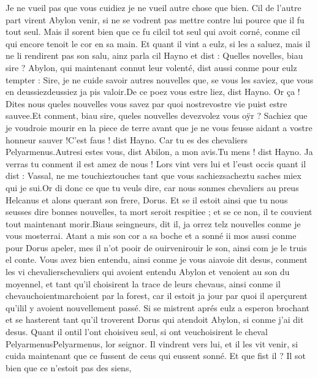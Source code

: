 \documentclass{article}
\begin{document}
\begin{pages}
   Je ne vueil pas que vous cuidiez je ne vueil autre chose que bien.
   Cil de l’autre part virent Abylon venir, si ne se vodrent pas mettre contre lui pource 
   que il fu tout seul. Mais il sorent bien que ce fu cilcil tot seul qui 
   avoit corné, conme cil qui encore tenoit le cor en sa main. Et quant il vint a eulz, si les a saluez, mais il ne li rendirent pas son 
   salu, ainz parla cil Hayno et dist :
   Quelles novelles, biau sire ? \pend
\pstart Abylon, qui maintenant connut leur volenté, 
   dist aussi conme pour eulz tempter :
   Sire, je ne cuide savoir autres nouvelles que, se vous 
      les saviez, que vous en 
      deussiezdeussiez ja pis valoir.De ce poez vous estre liez, dist Hayno. Or ça ! Dites nous queles 
      nouvelles vous savez par quoi nostrevostre vie puist estre sauvee.Et conment, biau sire, queles nouvelles 
      devezvolez vous oÿr ? 
   Sachiez que je voudroie mourir en la piece de terre avant que je ne vous feusse aidant a vostre honneur sauver !C’est faus ! dist Hayno. 
   Car tu es des chevaliers Pelyarmenus.Autresi estes vous, dist Abilon, a mon avis.Tu mens ! dist Hayno. Ja verras tu conment il est amez de nous !
   Lors vint vers lui et l’eust occis quant il dist :
   Vassal, ne me touchieztouches tant que 
      vous sachiezsacheztu saches miex qui je sui.Or di donc ce que tu veuls dire, car nous sonmes chevaliers au preus 
      Helcanus et alons querant son frere, Dorus. Et se il estoit 
      ainsi que tu nous seusses dire bonnes nouvelles, ta mort seroit respitiee ; et se ce non, il te couvient tout maintenant morir.Biaus seingneurs, dit il, ja orrez telz nouvelles conme je vous mosterrai.
   Atant a mis son cor a sa boche et a sonné ii mos aussi conme pour Dorus apeler, 
   mes il n’ot pooir de ouirvenirouir le son, 
   ainsi com je 
      le truis el conte. \pend
\pstart Vous avez bien entendu, ainsi conme je 
   vous aiavoie 
   dit desus, 
   conment les vi chevalierschevaliers qui avoient entendu 
   Abylon et venoient au son du moyennel, et tant qu’il choisirent la trace de leurs chevaus, ainsi 
   conme il chevauchoientmarchoient par la forest, car il estoit ja jour 
   par quoi il aperçurent qu’ilil y avoient nouvellement passé. Si se mistrent 
   aprés eulz a esperon brochant et se hasterent tant 
   qu’il troverent Dorus qui atendoit Abylon, 
   si conme j’ai dit desus. Quant il ontil l'ont 
   choisiveu seul, si 
   ont veuchoisirent le cheval 
   PelyarmenusPelyarmenus, lor seignor. Il vindrent vers lui, 
   et il les vit venir, 
   si cuida maintenant que ce fussent de ceus qui eussent sonné. Et que fist il ? Il sot bien que ce n’estoit pas des siens, 

\end{pages}
\end{document}

